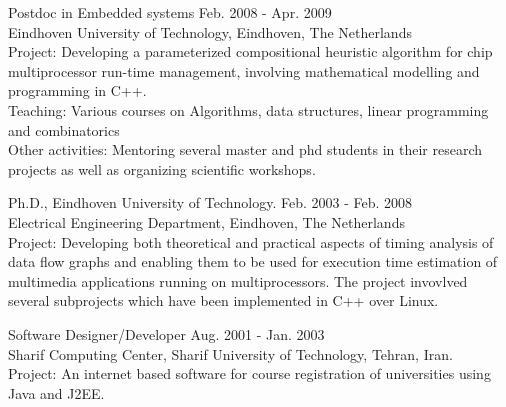 Postdoc in Embedded systems  \hfill Feb. 2008 - Apr. 2009 \\
Eindhoven University of Technology, Eindhoven, The Netherlands \\
\ifindustry
Project: Developing a parameterized compositional heuristic algorithm for chip multiprocessor run-time management, involving mathematical modelling and programming in C++.\\
Teaching: Various courses on Algorithms, data structures, linear programming and combinatorics \\
Other activities: Mentoring several master and phd students in their research projects as well as organizing scientific workshops.
\fi

Ph.D., Eindhoven University of Technology. \hfill Feb. 2003 - Feb. 2008 \\
Electrical Engineering Department, Eindhoven, The Netherlands \\
\ifindustry
Project: Developing both theoretical and practical aspects of timing analysis of data flow graphs
and enabling them to be used for execution time estimation of multimedia applications running on multiprocessors.
The project invovlved several subprojects which have been implemented in C++ over Linux.
\fi

Software Designer/Developer  \hfill Aug. 2001 - Jan. 2003 \\
Sharif Computing Center, Sharif University of Technology, Tehran, Iran. \\
\ifindustry
Project: An internet based software for course registration of universities using Java and J2EE.
\fi

